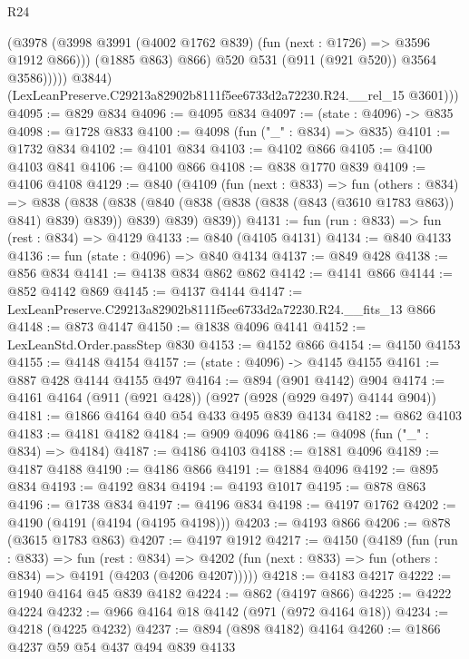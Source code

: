 \begin{lexlean}{R24}
\begin{coremodule}
                      (@3978
                        (@3998 @3991 (@4002 @1762 @839) (fun (next : @1726) => @3596 @1912 @866)))
                      (@1885 @863)
                      @866)
                    @520
                    @531
                    (@911 (@921 @520))
                    @3564
                    @3586)))))
          @3844)
        (LexLeanPreserve.C29213a82902b8111f5ee6733d2a72230.R24.__rel_15 @3601)))
@4095 := @829 @834
@4096 := @4095 @834
@4097 := (state : @4096) -> @835
@4098 := @1728 @833
@4100 := @4098 (fun ("_" : @834) => @835)
@4101 := @1732 @834
@4102 := @4101 @834
@4103 := @4102 @866
@4105 := @4100 @4103 @841
@4106 := @4100 @866
@4108 := @838 @1770 @839
@4109 := @4106 @4108
@4129 := @840
    (@4109
      (fun (next : @833) =>
      fun (others : @834) =>
      @838
        (@838 (@838 (@840 (@838 (@838 (@838 (@843 (@3610 @1783 @863)) @841) @839) @839)) @839) @839)
        @839))
@4131 := fun (run : @833) => fun (rest : @834) => @4129
@4133 := @840 (@4105 @4131)
@4134 := @840 @4133
@4136 := fun (state : @4096) => @840 @4134
@4137 := @849 @428
@4138 := @856 @834
@4141 := @4138 @834 @862 @862
@4142 := @4141 @866
@4144 := @852 @4142 @869
@4145 := @4137 @4144
@4147 := LexLeanPreserve.C29213a82902b8111f5ee6733d2a72230.R24.__fits_13 @866
@4148 := @873 @4147
@4150 := @1838 @4096 @4141
@4152 := LexLeanStd.Order.passStep @830
@4153 := @4152 @866
@4154 := @4150 @4153
@4155 := @4148 @4154
@4157 := (state : @4096) -> @4145 @4155
@4161 := @887 @428 @4144 @4155 @497
@4164 := @894 (@901 @4142) @904
@4174 := @4161 @4164 (@911 (@921 @428)) (@927 (@928 (@929 @497) @4144 @904))
@4181 := @1866 @4164 @40 @54 @433 @495 @839 @4134
@4182 := @862 @4103
@4183 := @4181 @4182
@4184 := @909 @4096
@4186 := @4098 (fun ("_" : @834) => @4184)
@4187 := @4186 @4103
@4188 := @1881 @4096
@4189 := @4187 @4188
@4190 := @4186 @866
@4191 := @1884 @4096
@4192 := @895 @834
@4193 := @4192 @834
@4194 := @4193 @1017
@4195 := @878 @863
@4196 := @1738 @834
@4197 := @4196 @834
@4198 := @4197 @1762
@4202 := @4190 (@4191 (@4194 (@4195 @4198)))
@4203 := @4193 @866
@4206 := @878 (@3615 @1783 @863)
@4207 := @4197 @1912
@4217 := @4150
    (@4189
      (fun (run : @833) =>
      fun (rest : @834) =>
      @4202 (fun (next : @833) => fun (others : @834) => @4191 (@4203 (@4206 @4207)))))
@4218 := @4183 @4217
@4222 := @1940 @4164 @45 @839 @4182
@4224 := @862 (@4197 @866)
@4225 := @4222 @4224
@4232 := @966 @4164 @18 @4142 (@971 (@972 @4164 @18))
@4234 := @4218 (@4225 @4232)
@4237 := @894 (@898 @4182) @4164
@4260 := @1866
    @4237
    @59
    @54
    @437
    @494
    @839
    @4133

\end{coremodule}
\end{lexlean}
